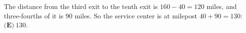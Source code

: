 The distance from the third exit to the tenth exit is $160-40=120$ miles, and three-fourths of it is $90$ miles. So the service center is at milepost $40+90=130$: $\boxed{\textbf{(E)}\ 130}$.
